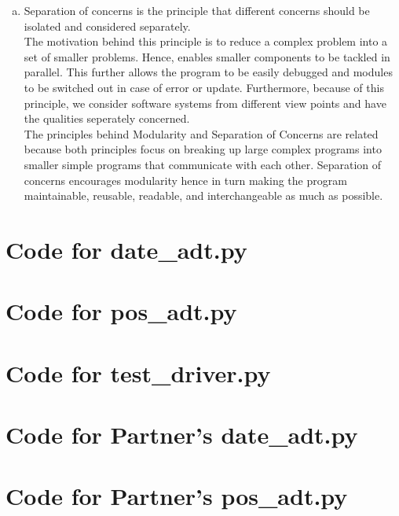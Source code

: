 \documentclass[12pt]{article}
\begin{document}
\begin{enumerate}[(g)]

\item Separation of concerns is the principle that different concerns should be isolated and considered separately.\\

The motivation behind this principle is to reduce a complex problem into a set of smaller problems. Hence, enables smaller components to be tackled in parallel. This further allows the program to be easily debugged and modules to be switched out in case of error or update. Furthermore, because of this principle, we consider software systems from different view points and have the qualities seperately concerned.\\

The principles behind Modularity and Separation of Concerns are related because both principles focus on breaking up large complex programs into smaller simple programs that communicate with each other. Separation of concerns encourages modularity hence in turn making the program maintainable, reusable, readable, and interchangeable as much as possible.

\end{enumerate}

\newpage

\lstset{language=Python, basicstyle=\tiny, breaklines=true, showspaces=false,
  showstringspaces=false, breakatwhitespace=true}

\def\thesection{\Alph{section}}

\section{Code for date\_adt.py}

\noindent 

\newpage

\section{Code for pos\_adt.py}

\noindent 

\newpage

\section{Code for test\_driver.py}

\noindent 

\newpage

\section{Code for Partner's date\_adt.py}

\noindent 

\section{Code for Partner's pos\_adt.py}

\noindent 
\end{document}
